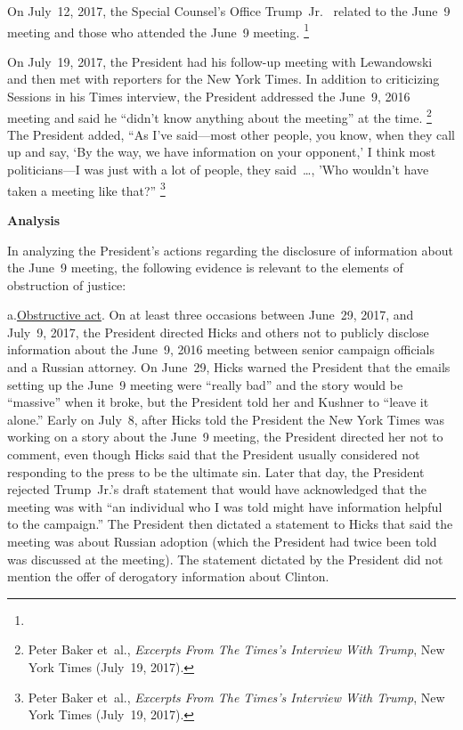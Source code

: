 On July~12, 2017, the Special Counsel's Office  Trump~Jr.\
 related to the June~9 meeting and those who attended the June~9 meeting.%
\footnote{\blackout{Grand Jury}}

On July~19, 2017, the President had his follow-up meeting with Lewandowski and then met with reporters for the New York Times.
In addition to criticizing Sessions in his Times interview, the President addressed the June~9, 2016 meeting and said he ``didn't know anything about the meeting'' at the time.%
\footnote{Peter Baker et~al., \textit{Excerpts From The Times's Interview With Trump}, New York Times (July~19, 2017).}
The President added, ``As I've said---most other people, you know, when they call up and say, `By the way, we have information on your opponent,' I think most politicians---I was just with a lot of people, they said~\dots,
'Who wouldn't have taken a meeting like that?''%
\footnote{Peter Baker et~al., \textit{Excerpts From The Times's Interview With Trump}, New York Times (July~19, 2017).}

\begin{center}
\textbf{Analysis}
\end{center}

In analyzing the President's actions regarding the disclosure of information about the June~9 meeting, the following evidence is relevant to the elements of obstruction of justice:

a.\qquad\underline{Obstructive act}.
On at least three occasions between June~29, 2017, and July~9, 2017, the President directed Hicks and others not to publicly disclose information about the June~9, 2016 meeting between senior campaign officials and a Russian attorney.
On June~29, Hicks warned the President that the emails setting up the June~9 meeting were ``really bad'' and the story would be ``massive'' when it broke, but the President told her and Kushner to ``leave it alone.''
Early on July~8, after Hicks told the President the New York Times was working on a story about the June~9 meeting, the President directed her not to comment, even though Hicks said that the President usually considered not responding to the press to be the ultimate sin.
Later that day, the President rejected Trump~Jr.'s draft statement that would have acknowledged that the meeting was with ``an individual who I was told might have information helpful to the campaign.'' The President then dictated a statement to Hicks that said the meeting was about Russian adoption (which the President had twice been told was discussed at the meeting).
The statement dictated by the President did not mention the offer of derogatory information about Clinton.

